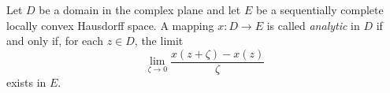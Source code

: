 Let $D$ be a domain in the complex plane and let $E$ be a sequentially complete locally convex Hausdorff space. A mapping $x : D \to E$ is called \textit{analytic} in $D$ if and only if, for each $z \in D$, the limit
$$\lim_{\zeta \to 0} \frac{x(z + \zeta) - x(z)}{\zeta}$$
exists in $E$.
